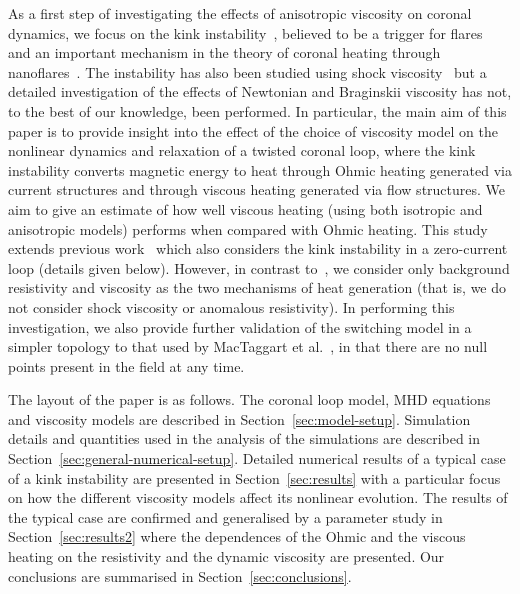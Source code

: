 As a first step of investigating the effects of anisotropic viscosity on coronal dynamics, we focus on the kink instability~\cite{hoodKinkInstabilitySolar1979, hoodCoronalHeatingMagnetic2009}, believed to be a trigger for flares~\cite{srivastavaOBSERVATIONKINKINSTABILITY2010} and an important mechanism in the theory of coronal heating through nanoflares~\cite{browningHeatingCoronaNanoflares2008a}. The instability has also been studied using shock viscosity~\cite{hoodCoronalHeatingMagnetic2009,barefordShockHeatingNumerical2015} but a detailed investigation of the effects of Newtonian and Braginskii viscosity has not, to the best of our knowledge, been performed.
In particular, the main aim of this paper is to provide insight into the effect of the choice of viscosity model on the nonlinear dynamics and relaxation of a twisted coronal loop, where the kink instability converts magnetic energy to heat through Ohmic heating generated via current structures and through viscous heating generated via flow structures. We aim to give an estimate of how well viscous heating (using both isotropic and anisotropic models) performs when compared with Ohmic heating. This study extends previous work~\cite{hoodCoronalHeatingMagnetic2009} which also considers the kink instability in a zero-current loop (details given below). However, in contrast to~\cite{hoodCoronalHeatingMagnetic2009}, we consider only background resistivity and viscosity as the two mechanisms of heat generation (that is, we do not consider shock viscosity or anomalous resistivity). In performing this investigation, we also provide further validation of the switching model in a simpler topology to that used by MacTaggart et al.~\cite{mactaggartBraginskiiMagnetohydrodynamicsArbitrary2017}, in that there are no null points present in the field at any time.

The layout of the paper is as follows. The coronal loop model, MHD
equations and viscosity models are described in
Section~\ref{sec:model-setup}. Simulation details and quantities
  used in the analysis of the simulations are described in
  Section~\ref{sec:general-numerical-setup}. Detailed numerical
results of a typical case of a kink instability are presented in
Section~\ref{sec:results} with a particular focus on how the different
viscosity models affect its nonlinear evolution. The results of
the typical case are confirmed and generalised by a parameter
  study in Section~\ref{sec:results2} where the dependences of the
Ohmic and the viscous heating on the resistivity and the dynamic
viscosity are presented. Our conclusions are summarised in Section~\ref{sec:conclusions}.

